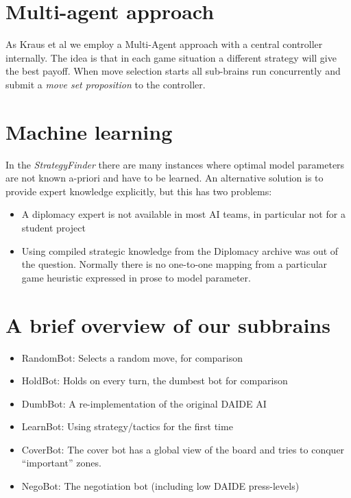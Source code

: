 \documentclass[pdftex,11pt,a4paper]{report}
\begin{document}
\section{Multi-agent approach}

As Kraus et al \cite{Kraus95} we employ a Multi-Agent approach with a 
central controller internally. The idea is that in each game situation
a different strategy will give the best payoff. When move selection starts
all sub-brains run concurrently and submit a \textit{move set proposition} to
the controller. 

\section{Machine learning}

In the \textit{StrategyFinder} there are many instances where optimal model parameters
are not known a-priori and have to be learned. An alternative solution is to provide
expert knowledge explicitly, but this has two problems:

\begin{itemize}

\item A diplomacy expert is not available in most AI teams, in 
      particular not for a student project

\item Using compiled strategic knowledge from the Diplomacy archive
      \cite{DipArchive04} was out of the question. Normally there
      is no one-to-one mapping from a particular game heuristic expressed
      in prose to model parameter. 

\end{itemize}

\section{A brief overview of our subbrains}

\begin{itemize}

\item RandomBot: Selects a random move, for comparison

\item HoldBot: Holds on every turn, the dumbest bot for comparison

\item DumbBot: A re-implementation of the original DAIDE AI

\item LearnBot: Using strategy/tactics for the first time

\item CoverBot: The cover bot has a global view of the board and tries to 
                conquer ``important'' zones.

\item NegoBot: The negotiation bot (including low DAIDE press-levels)

\end{itemize}
\end{document}
